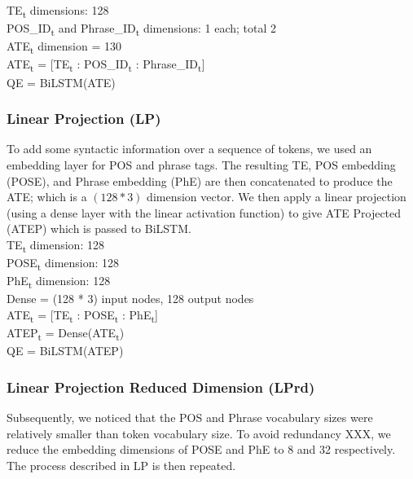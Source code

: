 \documentclass{IEEEtran}
\begin{document}
        \hspace*{-3.5mm}TE\textsubscript{t} dimensions: 128 \\
        POS\_ID\textsubscript{t} and Phrase\_ID\textsubscript{t} dimensions: 1 each; total 2 \\
        ATE\textsubscript{t} dimension = 130 \\

        \hspace*{-3.5mm}ATE\textsubscript{t} = [TE\textsubscript{t} : 
        POS\_ID\textsubscript{t} : Phrase\_ID\textsubscript{t}] \\
        QE = BiLSTM(ATE) \\

        \subsubsection{Linear Projection (LP)}
        To add some syntactic information over a sequence of tokens, we used an embedding layer for
        POS and phrase tags. The resulting TE, POS embedding (POSE), and Phrase embedding (PhE) are
        then concatenated to produce the ATE; which is a $ (128 * 3) $ dimension vector. We then
        apply a linear projection (using a dense layer with the linear activation function) to 
        give ATE Projected (ATEP) which is passed to BiLSTM. \\

        \hspace*{-3.5mm}TE\textsubscript{t} dimension: 128 \\
        POSE\textsubscript{t} dimension: 128 \\
        PhE\textsubscript{t} dimension: 128 \\
        Dense = (128 * 3) input nodes, 128 output nodes \\ 

        \hspace*{-3.5mm}ATE\textsubscript{t} = [TE\textsubscript{t} : 
        POSE\textsubscript{t} : PhE\textsubscript{t}] \\
        ATEP\textsubscript{t} = Dense(ATE\textsubscript{t}) \\
        QE = BiLSTM(ATEP) \\

        \subsubsection{Linear Projection Reduced Dimension (LPrd)} 
        Subsequently, we noticed that the POS and Phrase vocabulary sizes were relatively smaller
        than token vocabulary size. To avoid redundancy XXX, we reduce the embedding dimensions
        of POSE and PhE to 8 and 32 respectively. The process described in LP is then repeated. \\
\end{document}
